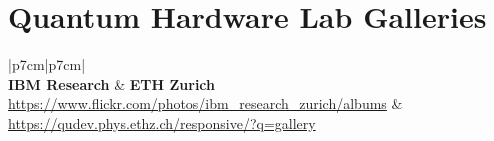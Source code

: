 \chapter{\LARGE{Quantum Hardware Lab Galleries}}

\LARGE\begin{tabular}{ |p{7cm}|p{7cm}| }
 \hline
  \\
 \hline
\textbf{\Large{IBM Research}} & 
\textbf{\Large{ETH Zurich}} \\ {\normalsize\url{https://www.flickr.com/photos/ibm_research_zurich/albums}}  &  {\normalsize\url{https://qudev.phys.ethz.ch/responsive/?q=gallery}} \\
\hline
{} \\
\hline
\end{tabular}
